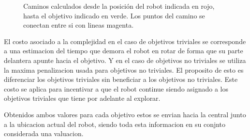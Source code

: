 \begin{figure}[H]
  \centerfloat

  \qquad

  \caption[Camino.]{Caminos calculados desde la posición del robot indicada en
  rojo, hasta el objetivo indicado en verde. Los puntos del camino se conectan
entre si con lineas magenta.}\label{fig:camino}

\end{figure}


El costo asociado a la complejidad en el caso de objetivos triviales se
corresponde a una estimacion del tiempo que demora el robot en rotar de forma
que su parte delantera apunte hacia el objetivo. Y en el caso de objetivos no
triviales se utiliza la maxima penalizacion usada para objetivos no triviales.
El proposito de esto es diferenciar los objetivos triviales sin beneficiar a
los objetivos no triviales. Este costo se aplica para incentivar a que el robot
continue siendo asignado a los objetivos triviales que tiene por adelante al
explorar.

Obtenidos ambos valores para cada objetivo estos se envian hacia la central
junto a la ubicacion actual del robot, siendo toda esta informacion en su
conjnto considerada una valuacion. %

